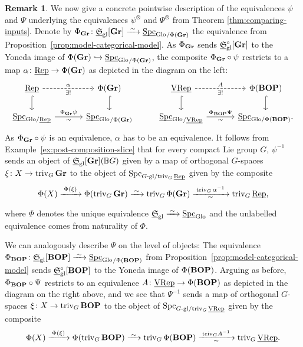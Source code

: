 \documentclass[reqno]{memo-l}
\theoremstyle{mythm}
\theoremstyle{definition}
\newtheorem{rk}[thm]{Remark}
\numberwithin{equation}{section}
\newcommand{\gl}{\textup{gl}}
\DeclareMathOperator{\Spc}{Spc}
\newcommand{\cat}[1]{\textbf{\textup{#1}}}
\newcommand{\triv}{{\textup{triv}}}
\newcommand{\Glo}{\textup{Glo}}
\newcommand{\BGcat}[1]{\mathbb B{#1}}
\newcommand{\ulhelper}[2]{\underline{\setbox0=\hbox{$#1#2$}\dp0=0.4pt \box0\relax}}
\newcommand{\ul}[1]{{\mathpalette\ulhelper{#1}}\hbox{\rule[-2pt]{0pt}{0pt}}}
\newcommand{\iso}{\xrightarrow{\;\smash{\raisebox{-0.25ex}{\ensuremath{\scriptstyle\sim}}}\;}}
\newcommand{\myS}{{{\mathfrak S\kern-.4pt}}}
\newcommand{\VRep}{\textup{VRep}}
\newcommand{\Vect}{\textup{Rep}}
\newcommand{\BOP}{\cat{BOP}}
\newcommand{\Gr}{\cat{Gr}}
\begin{document}
\begin{rk}\label{rk:explicit-description-psi}
    We now give a concrete pointwise description of the equivalences $\psi$ and $\Psi$ underlying the equivalences $\psi^{\otimes}$ and $\Psi^{\otimes}$ from Theorem \ref{thm:comparing-inputs}. 
    Denote by $\Phi_{\Gr}\colon \ul\myS_{\gl}[\Gr]\iso {\ul\Spc_{\Glo}}_{/\Phi(\Gr)}$ the equivalence from Proposition~\ref{prop:model-categorical-model}.
    As $\Phi_{\Gr}$ sends $\ul\myS_{\gl}^{\circ}[\Gr]$ to the Yoneda image of $\Phi(\Gr)\hookrightarrow {\ul\Spc_{\Glo}}_{/\Phi(\Gr)}$, the composite $\Phi_{\Gr}\circ \psi$ restricts to a map $\alpha\colon \ul\Vect\to \Phi(\Gr)$ as depicted in the diagram on the left:
    \[
    \begin{tikzcd}
    \ul\Vect\arrow[r,"\alpha", "\exists !"', dashed] \arrow[d, hookrightarrow]&[1em]  \Phi(\Gr)\arrow[d, hookrightarrow ] & \ul\VRep\arrow[r,"A","\exists !"', dashed] \arrow[d, hookrightarrow]&[1em]  \Phi(\BOP)\arrow[d, hookrightarrow]\\ 
    \ul\Spc_{\Glo/\ul\Vect}\arrow[r,"\Phi_{\Gr}\psi", "\sim"'] & {\ul\Spc_{\Glo}}_{/\Phi(\Gr)} &     {\ul\Spc_{\Glo}}_{/\ul\VRep}\arrow[r,"\Phi_{\BOP}\Psi","\sim"'] & \ul\Spc_{\Glo/\Phi(\BOP)}.
    \end{tikzcd}    \]
    As $\Phi_{\Gr}\circ \psi$ is an equivalence, $\alpha$ has to be an equivalence. 
    It follows from Example~\ref{ex:post-composition-slice} that  for every compact Lie group $G$, $\psi^{-1}$ sends an object of $\ul\myS_{\gl}[\Gr](\BGcat{G})$ given by a map of orthogonal $G$-spaces 
    $\xi \colon X\to \triv_G\,\Gr$ to the object of $\Spc_{\text{$G$-gl}/\triv_G\,\ul\Vect}$ given by the composite    
    \[\Phi(X)\xrightarrow{\;\Phi(\xi)\;} \Phi(\triv_G\,\Gr)\iso \triv_G\,\Phi(\Gr) \xrightarrow[\raise3.5pt\hbox{$\scriptstyle\smash{\sim}$}]{\;\triv_G\,\alpha^{-1}\;}\triv_G\,\ul\Vect,\] where $\Phi$ denotes the unique equivalence $\ul\myS_{\gl}\iso \ul\Spc_{\Glo}$ and the unlabelled equivalence comes from naturality of $\Phi$.

    We can analogously describe $\Psi$ on the level of objects: 
    The equivalence $\Phi_{\BOP}\colon \ul\myS_{\gl}[\BOP]\iso {\ul\Spc_{\Glo}}_{/\Phi(\BOP)}$ from Proposition~\ref{prop:model-categorical-model} sends $\ul\myS_{\gl}^{\circ}[\BOP]$ to the Yoneda image of $\Phi(\BOP)$. 
    Arguing as before, $\Phi_{\BOP}\circ \Psi$ restricts to an equivalence $A\colon \ul\VRep\to \Phi(\BOP)$ as depicted in the diagram on the right above, and we see that $\Psi^{-1}$ sends a map of orthogonal $G$-spaces $\xi\colon X\to \triv_G\,\BOP$ to the object of  $\Spc_{\text{$G$-gl}/\triv_G\,\ul\VRep}$ given by the composite\[\Phi(X)\xrightarrow{\;\Phi(\xi)\;}\Phi(\triv_G\,\BOP)\iso \triv_G\,\Phi(\BOP)\xrightarrow[\raise3.5pt\hbox{$\scriptstyle\smash{\sim}$}]{\;\triv_GA^{-1}\;}\triv_G\,\ul\VRep.\] 


\end{rk}
\end{document}
